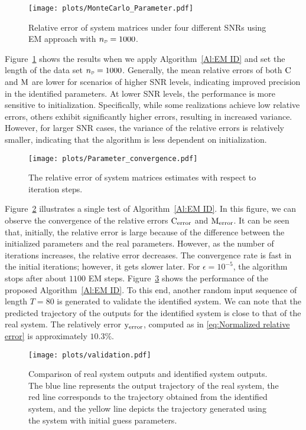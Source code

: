 \begin{figure}[t!]
   \centering
   \texttt{[image: plots/MonteCarlo\_Parameter.pdf]}
   \caption{Relative error of system matrices under four different SNRs using EM approach with $\nD=1000$.}
   \label{img:MonteCarlo}
\end{figure}


Figure~\ref{img:MonteCarlo} shows the results when we apply Algorithm~\ref{Al:EM ID} and set the length of the data set $\nD=1000$. Generally, the mean relative errors of both ${ \mathrm{C} }$ and ${ \mathrm{M} }$ are lower for scenarios of higher SNR levels, indicating improved precision in the identified parameters. At lower SNR levels, the performance is more sensitive to initialization. Specifically, while some realizations achieve low relative errors, others exhibit significantly higher errors, resulting in increased variance. However, for larger SNR cases, the variance of the relative errors is relatively smaller, indicating that the algorithm is less dependent on initialization. 

\begin{figure}[t!]
   \centering
   \texttt{[image: plots/Parameter\_convergence.pdf]}
   \caption{The relative error of system matrices estimates with respect to iteration steps.}
   \label{img:convergence}
\end{figure}

Figure~\ref{img:convergence} illustrates a single test of Algorithm~\ref{Al:EM ID}. In this figure, we can  observe the convergence of the relative errors ${ \mathrm{C} }_\text{error}$ and ${ \mathrm{M} }_\text{error}$. It can be seen that, initially, the relative error is large because of the difference between the initialized parameters and the real parameters. However, as the number of iterations increases, the relative error decreases. The convergence rate is fast in the initial iterations; however, it gets slower later. For $\epsilon = 10^{-5}$, the algorithm stops after about $1100$ EM steps. Figure~\ref{img:validation} shows the performance of the proposed Algorithm~\ref{Al:EM ID}. To this end, another random input sequence of length $T = 80$ is generated to validate the identified system. We can note that the predicted trajectory of the outputs for the identified system is close to that of the real system. The relatively error ${ \mathrm{y} }_{\text{error}}$, computed as in \eqref{eq:Normalized relative error} is approximately $10.3\%$. 

\begin{figure}[t!]
   \centering
   \texttt{[image: plots/validation.pdf]}
   \caption{Comparison of real system outputs and identified system outputs. The blue line represents the output trajectory of the real system, the red line corresponds to the trajectory obtained from the identified system, and the yellow line depicts the trajectory generated using the system with initial guess parameters. }
   \label{img:validation}
\end{figure}


